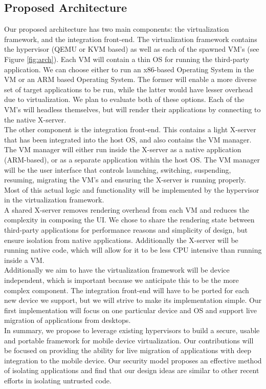 \subsection{Proposed Architecture}
\label{sec:proposedarch}
Our proposed architecture has two main components: the virtualization framework, and the integration front-end.  The virtualization framework contains the hypervisor (QEMU or KVM based) as well as each of the spawned VM's (see Figure \ref{fig:arch}).  Each VM will contain a thin OS for running the third-party application.  We can choose either to run an x86-based Operating System in the VM or an ARM based Operating System. The former will enable a more diverse set of target applications to be run, while the latter would have lesser overhead due to virtualization. We plan to evaluate both of these options. Each of the VM's will headless themselves, but will render their applications by connecting to the native X-server. \\

The other component is the integration front-end.  This contains a light X-server that has been integrated into the host OS, and also contains the VM manager.  The VM manager will either run inside the X-server as a native application (ARM-based), or as a separate application within the host OS.  The VM manager will be the user interface that controls launching, switching, suspending, resuming, migrating the VM's and ensuring the X-server is running properly. Most of this actual logic and functionality will be implemented by the hypervisor in the virtualization framework.\\

A shared X-server removes rendering overhead from each VM and reduces the complexity in composing the UI. We chose to share the rendering state between third-party applications for performance reasons and simplicity of design, but ensure isolation from native applications.  Additionally the X-server will be running native code, which will allow for it to be less CPU intensive than running inside a VM. \\

Additionally we aim to have the virtualization framework will be device independent, which is important because we anticipate this to be the more complex component.  The integration front-end will have to be ported for each new device we support, but we will strive to make its implementation simple. Our first implementation will focus on one particular device and OS and support live migration of applications from desktops. \\

In summary, we propose to leverage existing hypervisors to build a secure, usable and portable framework for mobile device virtualization. Our contributions will be focused on providing the ability for live migration of applications with deep integration to the mobile device. Our security model proposes an effective method of isolating applications and find that our design ideas are similar to other recent efforts \cite{grier2008secure} in isolating untrusted code.

